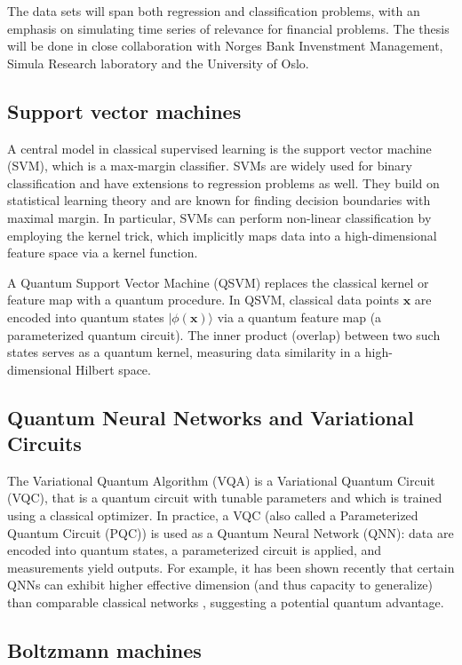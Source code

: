 \documentclass[%
oneside,                 %
final,                   %
10pt]{article}
\begin{document}
\noindent
The data sets will span both regression and classification problems,
with an emphasis on simulating time series of relevance for financial
problems. The thesis will be done in close collaboration with Norges
Bank Invenstment Management, Simula Research laboratory and the
University of Oslo.

\subsection*{Support vector machines}

A central model in classical
supervised learning is the support vector machine (SVM), which is a
max-margin classifier.  SVMs are widely used for binary classification
and have extensions to regression problems as well.
They build on statistical learning
theory and are known for finding decision boundaries with maximal
margin.  In particular, SVMs can perform non-linear classification by
employing the kernel trick, which implicitly maps data into a
high-dimensional feature space via a kernel function.

A Quantum Support Vector Machine (QSVM) replaces the classical kernel
or feature map with a quantum procedure.  In QSVM, classical data
points $\bm{x}$ are encoded into quantum states
$|\phi(\bm{x})\rangle$ via a quantum feature map (a parameterized
quantum circuit).  The inner product (overlap) between two such states
serves as a quantum kernel, measuring data similarity in a
high-dimensional Hilbert space.

\subsection*{Quantum Neural Networks and Variational Circuits}

The Variational Quantum Algorithm (VQA) is a 
Variational Quantum Circuit (VQC), that is  a quantum circuit with tunable
parameters and which is trained using a classical optimizer.  In practice, a
VQC (also called a Parameterized Quantum Circuit (PQC)) is used as a
Quantum Neural Network (QNN): data are encoded into quantum states, a
parameterized circuit is applied, and measurements yield outputs.
For example, it has been shown recently that certain QNNs can exhibit higher
effective dimension (and thus capacity to generalize) than comparable
classical networks , suggesting a potential quantum advantage.

\subsection*{Boltzmann machines}
\end{document}
